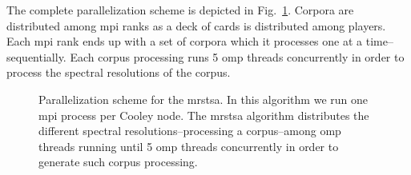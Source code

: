\documentclass[10pt,journal,compsoc]{IEEEtran}
\begin{document}
The complete parallelization scheme is depicted in Fig.~\ref{fig:MRSTSA_Parallelization}. Corpora are distributed among \gls{mpi} ranks as a deck of cards is distributed among players. Each \gls{mpi} rank ends up with a set of corpora which it processes one at a time--sequentially. Each corpus processing runs 5 \gls{omp} threads concurrently in order to process the spectral resolutions of the corpus. 

\begin{figure}[tb] 
    \centering
    \hfill
	\caption{Parallelization scheme for the \gls{mrstsa}. In this algorithm we run one \gls{mpi} process per Cooley node. The \gls{mrstsa} algorithm distributes the different spectral resolutions--processing a corpus--among \gls{omp} threads running until 5 \gls{omp} threads concurrently in order to generate such corpus processing.}
  \label{fig:MRSTSA_Parallelization} 
\end{figure}
\end{document}
